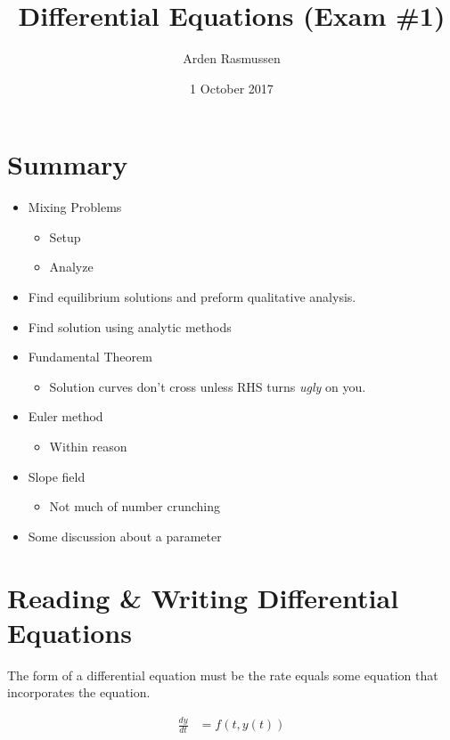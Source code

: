 \documentclass{article}
\title{Differential Equations (Exam \#1)}
\author{Arden Rasmussen}
\date{1 October 2017}
\begin{document}
\maketitle
\newpage
\tableofcontents
\newpage
{}

\section{Summary}\label{sec:summary}

\begin{itemize}
  \item Mixing Problems
    \begin{itemize}
      \item Setup
      \item Analyze
    \end{itemize}
  \item Find equilibrium solutions and preform qualitative analysis.
  \item Find solution using analytic methods
  \item Fundamental Theorem
    \begin{itemize}
      \item Solution curves don't cross unless RHS turns \textit{ugly} on you.
    \end{itemize}
  \item Euler method
    \begin{itemize}
      \item Within reason
    \end{itemize}
  \item Slope field
    \begin{itemize}
      \item Not much of number crunching
    \end{itemize}
  \item Some discussion about a parameter
\end{itemize}
\newpage

\section{Reading \& Writing Differential Equations}\label{sec:reading_writing_differential_equations}

The form of a differential equation must be the rate equals some equation that
incorporates the equation.

\begin{align}
  \frac{dy}{dt} &= f(t,y(t))
\end{align}
\end{document}
